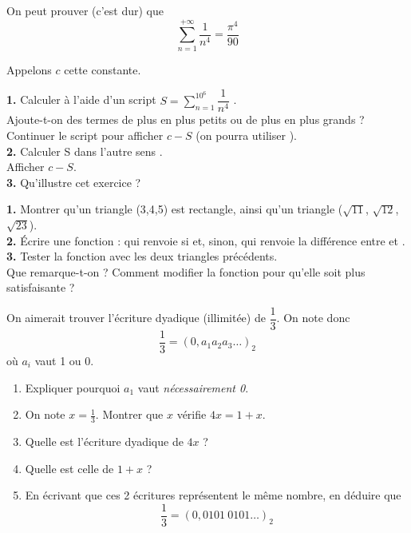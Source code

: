 \begin{exercice}
    On peut prouver (c'est dur) que $$\sum_{n=1}^{+\infty}\dfrac{1}{n^4}=\dfrac{\pi^4}{90}$$

    Appelons $c$ cette constante.

    \textbf{1.} Calculer à l'aide d'un script $\displaystyle S=\sum_{n=1}^{10^6}\dfrac{1}{n^4}$ .\\

    Ajoute-t-on des termes de plus en plus petits ou de plus en plus grands ?\\
    Continuer le script pour afficher $c-S$ (on pourra utiliser ).\\

    \textbf{2.} Calculer S \og dans l'autre sens \fg.\\
    Afficher $c-S$.\\

    \textbf{3.} Qu'illustre cet exercice ?
\end{exercice}


\begin{exercice}

    \textbf{1.}	Montrer qu'un triangle (3,4,5) est rectangle, ainsi qu'un triangle ($\sqrt{11}$, $\sqrt{12}$, $\sqrt{23}$).\\

    \textbf{2.} \'Ecrire une fonction : qui renvoie  si  et, sinon, qui renvoie la différence
    entre  et .\\

    \textbf{3.} Tester la fonction  avec les deux triangles précédents.\\
    Que remarque-t-on ? Comment modifier la fonction pour qu'elle soit plus satisfaisante ?
\end{exercice}

\begin{exercice}[**]
    On aimerait trouver l'écriture dyadique (illimitée) de $\dfrac{1}{3}$.
    On note donc $$\dfrac{1}{3}=(0,a_1a_2a_3\ldots)_2$$
    où $a_i$ vaut 1 ou 0.
    \begin{enumerate}
        \item 	Expliquer pourquoi $a_1$ vaut \textit{nécessairement 0}.
        \item 	On note $x=\frac{1}{3}$. Montrer que $x$ vérifie $4x=1+x$.
        \item 	Quelle est l'écriture dyadique de $4x$ ?
        \item 	Quelle est celle de $1+x$ ?
        \item 	En écrivant que ces 2 écritures représentent le même nombre, en déduire que $$\dfrac{1}{3}=(0,0101\ 0101\ldots )_2$$
    \end{enumerate}
\end{exercice}
